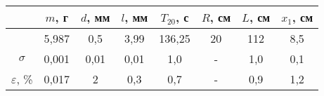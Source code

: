 \begin{tabular}{cccccccc}
	\toprule
	&$m$, г&$d$, мм&$l$, мм&$T_{20}$, с&$R$, см&$L$, см&$x_1$, см\\
	\midrule
	&5,987 &0,5    &3,99   &136,25   &20     &112    &8,5      \\
	$\sigma$         &0,001 &0,01   &0,01   &1,0      &-      &1,0    &0,1      \\
	$\varepsilon$, \%&0,017 &2      &0,3    &0,7      &-      &0,9    &1,2      \\
	\bottomrule
\end{tabular}